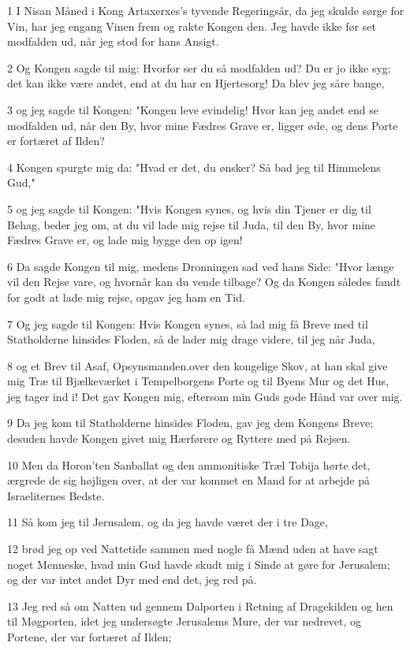 \par 1 I Nisan Måned i Kong Artaxerxes's tyvende Regeringsår, da jeg skulde sørge for Vin, har jeg engang Vinen frem og rakte Kongen den. Jeg havde ikke før set modfalden ud, når jeg stod for hans Ansigt.
\par 2 Og Kongen sagde til mig: Hvorfor ser du så modfalden ud? Du er jo ikke syg; det kan ikke være andet, end at du har en Hjertesorg! Da blev jeg såre bange,
\par 3 og jeg sagde til Kongen: "Kongen leve evindelig! Hvor kan jeg andet end se modfalden ud, når den By, hvor mine Fædres Grave er, ligger øde, og dens Porte er fortæret af Ilden?
\par 4 Kongen spurgte mig da: "Hvad er det, du ønsker? Så bad jeg til Himmelens Gud,"
\par 5 og jeg sagde til Kongen: "Hvis Kongen synes, og hvis din Tjener er dig til Behag, beder jeg om, at du vil lade mig rejse til Juda, til den By, hvor mine Fædres Grave er, og lade mig bygge den op igen!
\par 6 Da sagde Kongen til mig, medens Dronningen sad ved hans Side: "Hvor længe vil den Rejse vare, og hvornår kan du vende tilbage? Og da Kongen således fandt for godt at lade mig rejse, opgav jeg ham en Tid.
\par 7 Og jeg sagde til Kongen: Hvis Kongen synes, så lad mig få Breve med til Statholderne hinsides Floden, så de lader mig drage videre, til jeg når Juda,
\par 8 og et Brev til Asaf, Opsynsmanden.over den kongelige Skov, at han skal give mig Træ til Bjælkeværket i Tempelborgens Porte og til Byens Mur og det Hus, jeg tager ind i! Det gav Kongen mig, eftersom min Guds gode Hånd var over mig.
\par 9 Da jeg kom til Statholderne hinsides Floden, gav jeg dem Kongens Breve; desuden havde Kongen givet mig Hærførere og Ryttere med på Rejsen.
\par 10 Men da Horon'ten Sanballat og den ammonitiske Træl Tobija hørte det, ærgrede de sig højligen over, at der var kommet en Mand for at arbejde på Israeliternes Bedste.
\par 11 Så kom jeg til Jerusalem, og da jeg havde været der i tre Dage,
\par 12 brød jeg op ved Nattetide sammen med nogle få Mænd uden at have sagt noget Menneske, hvad min Gud havde skudt mig i Sinde at gøre for Jerusalem; og der var intet andet Dyr med end det, jeg red på.
\par 13 Jeg red så om Natten ud gennem Dalporten i Retning af Dragekilden og hen til Møgporten, idet jeg undersøgte Jerusalems Mure, der var nedrevet, og Portene, der var fortæret af Ilden;
